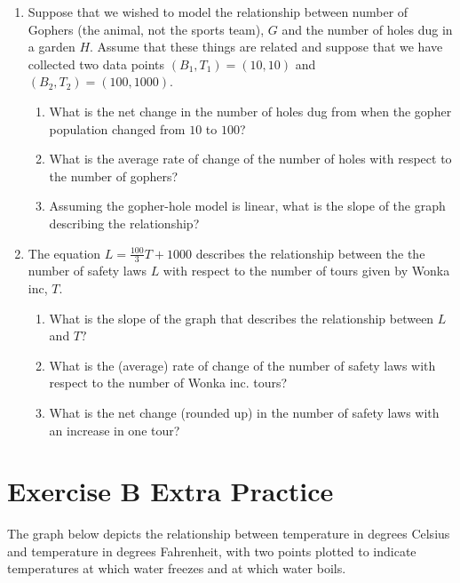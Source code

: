 \documentclass[12pt]{article}
\begin{document}
\begin{enumerate}

\item[(a)] Suppose that we wished to model the relationship between number of Gophers (the animal, not the sports team), $G$ and the number of holes dug in a garden $H$. Assume that these things are related and suppose that we have collected two data points $(B_1, T_1) = (10, 10)$ and $(B_2, T_2) = (100, 1000).$
    \begin{enumerate}
        \item[(i)] What is the net change in the number of holes dug from when the gopher population changed from $10$ to $100$?
        \item[(ii)]What is the average rate of change of the number of holes with respect to the number of gophers?
        \item[(iii)]Assuming the gopher-hole model is linear, what is the slope of the graph describing the relationship?
    \end{enumerate}
\item[(b)] The equation $L = \frac{100}{3}T + 1000$ describes the relationship between the the number of safety laws $L$ with respect to the number of tours given by Wonka inc, $T$.
    \begin{enumerate}
        \item[(i)] What is the slope of the graph that describes the relationship between $L$ and $T?$
        \item[(ii)]What is the (average) rate of change of the number of safety laws with respect to the number of Wonka inc. tours?
        \item[(iii)] What is the net change (rounded up) in the number of safety laws with an increase in one tour?
    \end{enumerate}

\end{enumerate}

\newpage
\section{Exercise B Extra Practice}



The graph below depicts the relationship between temperature in degrees Celsius and temperature in degrees Fahrenheit, with two points plotted to indicate temperatures at which water freezes and at which water boils.
\end{document}
